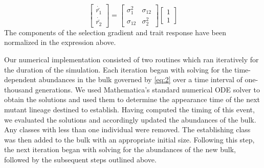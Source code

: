 \documentclass[11pt,twocolumn]{article}
\newcommand{\G}{\textbf{G }}
\begin{document}
% 
% 
% 
% 
% 
% 
\begin{equation}\label{eq:6}
\left[
\begin{array}{c}
\dot{\bar{r_1}} \\
\dot{\bar{r_2}} 
\end{array}
\right]
=
\left[
\begin{array}{cc}
\sigma_1^2 & \sigma_{12} \\
\sigma_{12} & \sigma_2^2 
\end{array}
\right]
\left[
\begin{array}{c}
1 \\
1 
\end{array}
\right]
\end{equation}
The components of the selection gradient and trait response have been normalized in the expression above. \par

Our numerical implementation consisted of two routines which ran iteratively for the duration of the simulation. Each iteration began with solving for the time-dependent abundances in the bulk governed by \eqref{eq:2} over a time interval of one-thousand generations. We used Mathematica's standard numerical ODE solver to obtain the solutions and used them to determine the appearance time of the next mutant lineage destined to establish. Having computed the timing of this event, we evaluated the solutions and accordingly updated the abundances of the bulk. Any classes with less than one individual were removed.  The establishing class was then added to the bulk with an appropriate initial size. Following this step, the next iteration began with solving for the abundances of the new bulk, followed by the subsequent steps outlined above.\par
\end{document}
